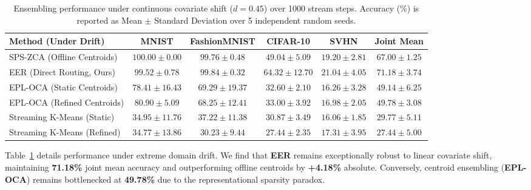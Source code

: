 \begin{table}[t]
\caption{Ensembling performance under continuous covariate shift ($d=0.45$) over 1000 stream steps. Accuracy (\%) is reported as Mean $\pm$ Standard Deviation over 5 independent random seeds.}
\label{tab:drift_results}
\vskip 0.15in
\begin{center}
\begin{small}
\begin{sc}
\begin{tabular}{lccccc}
\toprule
Method (Under Drift) & MNIST & FashionMNIST & CIFAR-10 & SVHN & Joint Mean \\
\midrule
SPS-ZCA (Offline Centroids) & $100.00 \pm 0.00$ & $99.76 \pm 0.48$ & $49.04 \pm 5.09$ & $19.20 \pm 2.81$ & $\mathbf{67.00 \pm 1.25}$ \\
\midrule
EER (Direct Routing, Ours) & $99.52 \pm 0.78$ & $99.84 \pm 0.32$ & $64.32 \pm 12.70$ & $21.04 \pm 4.05$ & $\mathbf{71.18 \pm 3.74}$ \\
\midrule
EPL-OCA (Static Centroids) & $78.41 \pm 16.43$ & $69.29 \pm 19.37$ & $32.60 \pm 2.10$ & $16.26 \pm 3.28$ & $\mathbf{49.14 \pm 6.25}$ \\
EPL-OCA (Refined Centroids) & $80.90 \pm 5.09$ & $68.25 \pm 12.41$ & $33.00 \pm 3.92$ & $16.98 \pm 2.05$ & $\mathbf{49.78 \pm 3.08}$ \\
\midrule
Streaming K-Means (Static) & $34.95 \pm 11.76$ & $37.22 \pm 11.38$ & $30.87 \pm 3.49$ & $16.06 \pm 1.85$ & $\mathbf{29.77 \pm 5.11}$ \\
Streaming K-Means (Refined) & $34.77 \pm 13.86$ & $30.23 \pm 9.44$ & $27.44 \pm 2.35$ & $17.31 \pm 3.95$ & $\mathbf{27.44 \pm 5.00}$ \\
\bottomrule
\end{tabular}
\end{sc}
\end{small}
\end{center}
\vskip -0.1in
\end{table}

Table~\ref{tab:drift_results} details performance under extreme domain drift. 
We find that \textbf{EER} remains exceptionally robust to linear covariate shift, maintaining \textbf{71.18\%} joint mean accuracy and outperforming offline centroids by \textbf{+4.18\%} absolute. Conversely, centroid ensembling (\textbf{EPL-OCA}) remains bottlenecked at \textbf{49.78\%} due to the representational sparsity paradox.

